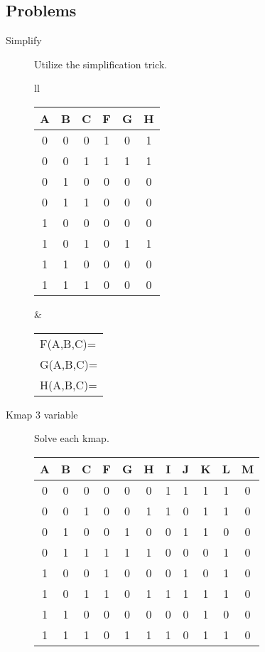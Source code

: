 \subsection{Problems}
\begin{description}

\item[Simplify] Utilize the simplification trick.

\begin{tabular}{ll}
\begin{tabular}{c|c|c||c|c|c}
A & B & C & F & G & H  \\ \hline
0 & 0 & 0 & 1 & 0 & 1  \\ \hline
0 & 0 & 1 & 1 & 1 & 1  \\ \hline
0 & 1 & 0 & 0 & 0 & 0  \\ \hline
0 & 1 & 1 & 0 & 0 & 0  \\ \hline
1 & 0 & 0 & 0 & 0 & 0  \\ \hline
1 & 0 & 1 & 0 & 1 & 1  \\ \hline
1 & 1 & 0 & 0 & 0 & 0  \\ \hline
1 & 1 & 1 & 0 & 0 & 0  \\
\end{tabular}
&
\begin{tabular}{l}
F(A,B,C)= \\
G(A,B,C)= \\
H(A,B,C)= \\
\end{tabular} 
\end{tabular}

\pagebreak

\item[Kmap 3 variable] Solve each kmap.

\begin{tabular}{c|c|c||c|c|c|c|c|c|c|c}
A & B & C & F & G & H & I & J & K & L & M  \\ \hline
0 & 0 & 0 & 0 & 0 & 0 & 1 & 1 & 1 & 1 & 0  \\ \hline
0 & 0 & 1 & 0 & 0 & 1 & 1 & 0 & 1 & 1 & 0  \\ \hline
0 & 1 & 0 & 0 & 1 & 0 & 0 & 1 & 1 & 0 & 0  \\ \hline
0 & 1 & 1 & 1 & 1 & 1 & 0 & 0 & 0 & 1 & 0  \\ \hline
1 & 0 & 0 & 1 & 0 & 0 & 0 & 1 & 0 & 1 & 0  \\ \hline
1 & 0 & 1 & 1 & 0 & 1 & 1 & 1 & 1 & 1 & 0  \\ \hline
1 & 1 & 0 & 0 & 0 & 0 & 0 & 0 & 1 & 0 & 0  \\ \hline
1 & 1 & 1 & 0 & 1 & 1 & 1 & 0 & 1 & 1 & 0  
\end{tabular}


\end{description}
